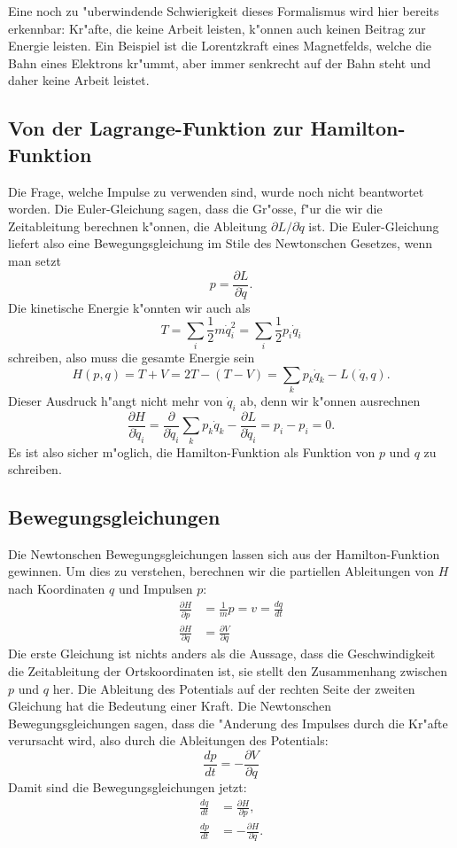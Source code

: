 Eine noch zu "uberwindende Schwierigkeit dieses Formalismus wird hier
bereits erkennbar: Kr"afte, die keine Arbeit leisten, k"onnen auch
keinen Beitrag zur Energie leisten.
Ein Beispiel ist
die Lorentzkraft eines Magnetfelds, welche die Bahn eines Elektrons 
kr"ummt, aber immer senkrecht auf der Bahn steht und daher keine Arbeit
leistet.

\subsection{Von der Lagrange-Funktion zur Hamilton-Funktion}
Die Frage, welche Impulse zu verwenden sind, wurde noch nicht beantwortet
worden.
Die Euler-Gleichung sagen, dass die Gr"osse, f"ur die wir die Zeitableitung
berechnen k"onnen, die Ableitung $\partial L/\partial\dot q$ ist.
Die Euler-Gleichung liefert also eine Bewegungsgleichung im Stile des
Newtonschen Gesetzes, wenn man setzt
\[
p=\frac{\partial L}{\partial \dot q}.
\]
Die kinetische Energie k"onnten wir auch als
\[
T=\sum_i \frac12m\dot q_i^2=\sum_i \frac12 p_i\dot q_i
\]
schreiben, also muss die gesamte Energie sein
\[
H(p,q)=T+V = 2T - (T - V)
=
\sum_k p_k\dot q_k - L(\dot q, q).
\]
Dieser Ausdruck h"angt nicht mehr von $\dot q_i$ ab, denn wir
k"onnen ausrechnen
\[
\frac{\partial H}{\partial\dot q_i}
=
\frac{\partial}{\partial \dot q_i}\sum_k p_k\dot q_k
-
\frac{\partial L}{\partial \dot q_i}
=
p_i-p_i=0.
\]
Es ist also sicher m"oglich, die Hamilton-Funktion als Funktion von $p$
und $q$ zu schreiben.

\subsection{Bewegungsgleichungen}
Die Newtonschen Bewegungsgleichungen lassen sich aus der Hamilton-Funktion
gewinnen. Um dies zu verstehen, berechnen wir die partiellen Ableitungen
von $H$ nach Koordinaten $q$ und Impulsen $p$:
\begin{align*}
\frac{\partial H}{\partial p}&=\frac{1}{m}p=v=\frac{dq}{dt} \\
\frac{\partial H}{\partial q}&=\frac{\partial V}{\partial q}
\end{align*}
Die erste Gleichung ist nichts anders als die Aussage, dass die
Geschwindigkeit die Zeitableitung der Ortskoordinaten ist, sie
stellt den Zusammenhang zwischen $p$ und $q$ her.
Die Ableitung des Potentials auf der rechten Seite der zweiten
Gleichung hat die Bedeutung einer Kraft.
Die Newtonschen Bewegungsgleichungen sagen, dass die "Anderung des
Impulses durch die Kr"afte verursacht wird, also durch die Ableitungen
des Potentials:
\[
\frac{dp}{dt}=-\frac{\partial V}{\partial q}
\]
Damit sind die Bewegungsgleichungen jetzt:
\begin{align}
\frac{dq}{dt}&= \frac{\partial H}{\partial p},\label{skript:hamilton-v}\\
\frac{dp}{dt}&=-\frac{\partial H}{\partial q}.\label{skript:hamilton-newton}
\end{align}

